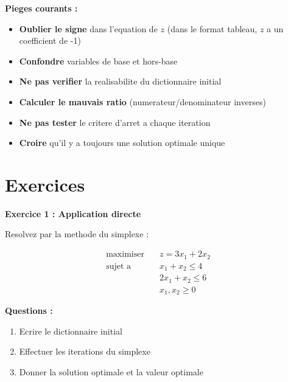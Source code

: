 \documentclass[12pt,a4paper]{article}
\begin{document}
\begin{important}
\textbf{Pieges courants :}

\begin{itemize}
    \item \textcolor{importantrouge}{\textbf{Oublier le signe}} dans l'equation de $z$ (dans le format tableau, $z$ a un coefficient de -1)
    
    \item \textcolor{importantrouge}{\textbf{Confondre}} variables de base et hors-base
    
    \item \textcolor{importantrouge}{\textbf{Ne pas verifier}} la realisabilite du dictionnaire initial
    
    \item \textcolor{importantrouge}{\textbf{Calculer le mauvais ratio}} (numerateur/denominateur inverses)
    
    \item \textcolor{importantrouge}{\textbf{Ne pas tester}} le critere d'arret a chaque iteration
    
    \item \textcolor{importantrouge}{\textbf{Croire}} qu'il y a toujours une solution optimale unique
\end{itemize}
\end{important}

\newpage
\section{Exercices}

\begin{exemple}
\textbf{Exercice 1 : Application directe}

Resolvez par la methode du simplexe :

\begin{align*}
\text{maximiser} \quad & z = 3x_1 + 2x_2\\
\text{sujet a} \quad & x_1 + x_2 \leq 4\\
& 2x_1 + x_2 \leq 6\\
& x_1, x_2 \geq 0
\end{align*}

\textbf{Questions :}
\begin{enumerate}
    \item Ecrire le dictionnaire initial
    \item Effectuer les iterations du simplexe
    \item Donner la solution optimale et la valeur optimale
\end{enumerate}
\end{exemple}
\end{document}
